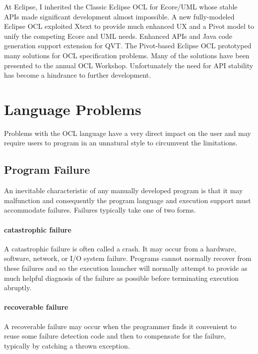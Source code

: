 \documentclass{jot}
\begin{document}
At Eclipse, I inherited the Classic Eclipse OCL for Ecore/UML whose stable APIs made significant development almost impossible. A new fully-modeled Eclipse OCL exploited Xtext to provide much enhanced UX and a Pivot model to unify the competing Ecore and UML needs. Enhanced APIs and Java code generation support extension for QVT. The Pivot-based Eclipse OCL prototyped many solutions for OCL specification problems. Many of the solutions have been presented to the annual OCL Workshop. Unfortunately the need for API stability has become a hindrance to further development.

\section{Language Problems}\label{Language Problems}

Problems with the OCL language have a very direct impact on the user and may require users to program in an unnatural style to circumvent the limitations.  

\subsection{Program Failure}

An inevitable characteristic of any manually developed program is that it may malfunction and consequently the program language and execution support must accommodate failures. Failures typically take one of two forms.

\paragraph{catastrophic failure} A catastrophic failure is often called a crash. It may occur from a hardware, software, network, or I/O system failure. Programs cannot normally recover from these failures and so the execution launcher will normally attempt to provide as much helpful diagnosis of the failure as possible before terminating execution abruptly.

\paragraph{recoverable failure} A recoverable failure may occur when the programmer finds it convenient to reuse some failure detection code and then to compensate for the failure, typically by catching a thrown exception.

\end{document}
